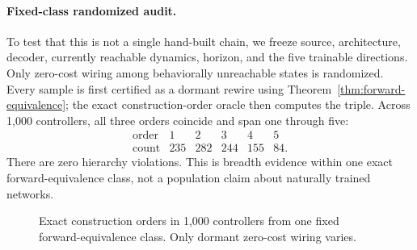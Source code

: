 \paragraph{Fixed-class randomized audit.}
To test that this is not a single hand-built chain, we freeze source, architecture, decoder, currently reachable dynamics, horizon, and the five trainable directions. Only zero-cost wiring among behaviorally unreachable states is randomized. Every sample is first certified as a dormant rewire using Theorem~\ref{thm:forward-equivalence}; the exact construction-order oracle then computes the triple. Across 1,000 controllers, all three orders coincide and span one through five:
\[
\begin{array}{c|ccccc}
\text{order} & 1&2&3&4&5\\\hline
\text{count} & 235&282&244&155&84.
\end{array}
\]
There are zero hierarchy violations. This is breadth evidence within one exact forward-equivalence class, not a population claim about naturally trained networks.

\begin{figure}[t]
\centering
{}
\caption{Exact construction orders in 1,000 controllers from one fixed forward-equivalence class. Only dormant zero-cost wiring varies.}
\label{fig:census}
\end{figure}
